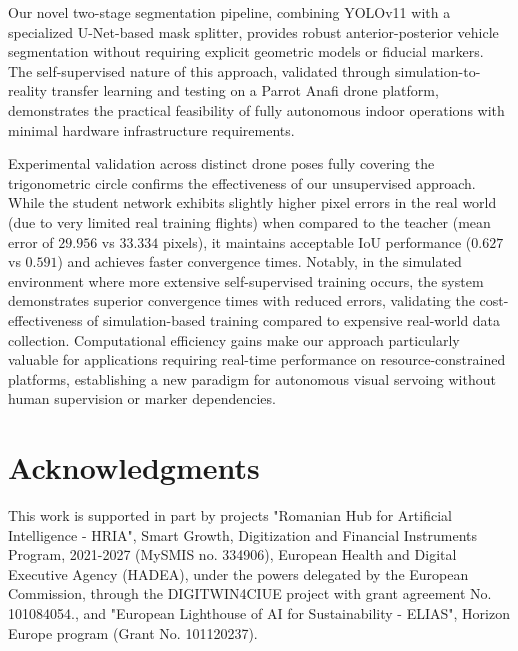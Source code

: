 \documentclass[10pt,twocolumn,letterpaper]{article}
\begin{document}
Our novel two-stage segmentation pipeline, combining YOLOv11 with a specialized U-Net-based mask splitter, provides robust anterior-posterior vehicle segmentation without requiring explicit geometric models or fiducial markers. The self-supervised nature of this approach, validated through simulation-to-reality transfer learning and testing on a Parrot Anafi drone platform, demonstrates the practical feasibility of fully autonomous indoor operations with minimal hardware infrastructure requirements. 

Experimental validation across distinct drone poses fully covering the trigonometric circle confirms the effectiveness of our unsupervised approach. While the student network exhibits slightly higher pixel errors in the real world (due to very limited real training flights) when compared to the teacher (mean error of $29.956$ vs $33.334$ pixels), it maintains acceptable IoU performance ($0.627$ vs $0.591$) and achieves faster convergence times. Notably, in the simulated environment where more extensive self-supervised training occurs, the system demonstrates superior convergence times with reduced errors, validating the cost-effectiveness of simulation-based training compared to expensive real-world data collection. Computational efficiency gains make our approach particularly valuable for applications requiring real-time performance on resource-constrained platforms, establishing a new paradigm for autonomous visual servoing without human supervision or marker dependencies.

\section*{Acknowledgments} 
This work is supported in part by projects "Romanian Hub for Artificial Intelligence - HRIA", Smart Growth, Digitization and Financial Instruments Program, 2021-2027 (MySMIS no. 334906), European Health and Digital Executive Agency (HADEA), under the powers delegated by the European Commission, through the DIGITWIN4CIUE project with grant agreement No. 101084054., and "European Lighthouse of AI for Sustainability - ELIAS", Horizon Europe program (Grant No. 101120237).
{
\small


}
\end{document}
